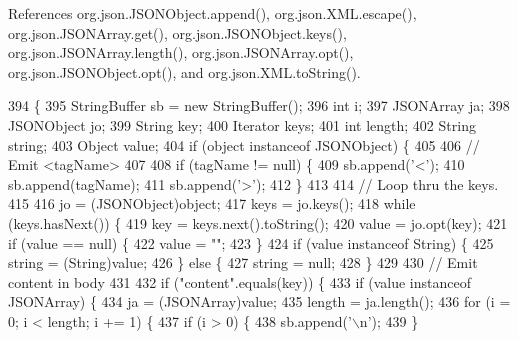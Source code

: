 References org.\-json.\-J\-S\-O\-N\-Object.\-append(), org.\-json.\-X\-M\-L.\-escape(), org.\-json.\-J\-S\-O\-N\-Array.\-get(), org.\-json.\-J\-S\-O\-N\-Object.\-keys(), org.\-json.\-J\-S\-O\-N\-Array.\-length(), org.\-json.\-J\-S\-O\-N\-Array.\-opt(), org.\-json.\-J\-S\-O\-N\-Object.\-opt(), and org.\-json.\-X\-M\-L.\-to\-String().


\begin{DoxyCode}
394                                  \{
395         StringBuffer sb = \textcolor{keyword}{new} StringBuffer();
396         \textcolor{keywordtype}{int}          i;
397         JSONArray    ja;
398         JSONObject   jo;
399         String       key;
400         Iterator     keys;
401         \textcolor{keywordtype}{int}          length;
402         String       string;
403         Object       value;
404         \textcolor{keywordflow}{if} (\textcolor{keywordtype}{object} instanceof JSONObject) \{
405 
406 \textcolor{comment}{// Emit <tagName>}
407 
408             \textcolor{keywordflow}{if} (tagName != null) \{
409                 sb.append(\textcolor{charliteral}{'<'});
410                 sb.append(tagName);
411                 sb.append(\textcolor{charliteral}{'>'});
412             \}
413 
414 \textcolor{comment}{// Loop thru the keys.}
415 
416             jo = (JSONObject)\textcolor{keywordtype}{object};
417             keys = jo.keys();
418             \textcolor{keywordflow}{while} (keys.hasNext()) \{
419                 key = keys.next().toString();
420                 value = jo.opt(key);
421                 \textcolor{keywordflow}{if} (value == null) \{
422                     value = \textcolor{stringliteral}{""};
423                 \}
424                 \textcolor{keywordflow}{if} (value instanceof String) \{
425                     \textcolor{keywordtype}{string} = (String)value;
426                 \} \textcolor{keywordflow}{else} \{
427                     \textcolor{keywordtype}{string} = null;
428                 \}
429 
430 \textcolor{comment}{// Emit content in body}
431 
432                 \textcolor{keywordflow}{if} (\textcolor{stringliteral}{"content"}.equals(key)) \{
433                     \textcolor{keywordflow}{if} (value instanceof JSONArray) \{
434                         ja = (JSONArray)value;
435                         length = ja.length();
436                         \textcolor{keywordflow}{for} (i = 0; i < length; i += 1) \{
437                             \textcolor{keywordflow}{if} (i > 0) \{
438                                 sb.append(\textcolor{charliteral}{'\(\backslash\)n'});
439                             \}

\end{DoxyCode}
